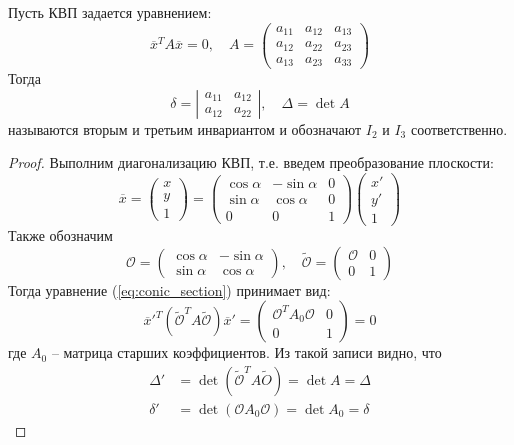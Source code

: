 \begin{Thm}
	Пусть КВП задается уравнением:
	\[\overline{x}^T A \overline{x} = 0, \quad A = \left(\begin{array}{ccc}
	a_{11} & a_{12} & a_{13} \\ 
	a_{12} & a_{22} & a_{23} \\ 
	a_{13} & a_{23} & a_{33}
	\end{array}\right)\]
	Тогда
	\[\delta = \left|\begin{array}{cc}
	a_{11} & a_{12} \\ 
	a_{12} & a_{22}
	\end{array}\right|, \quad \Delta = \det A\]
	называются вторым и третьим инвариантом и обозначают $I_2$ и $I_3$ соответственно. 
\end{Thm}

\begin{proof}
	Выполним диагонализацию КВП, т.е. введем преобразование плоскости:
	\begin{equation} \label{eq:conic_section}
		\overline{x} = \left(\begin{array}{c}
		x \\ 
		y \\ 
		1
		\end{array}\right) = \left(\begin{array}{ccc}
		\cos \alpha & -\sin \alpha & 0 \\ 
		\sin \alpha & \cos \alpha & 0 \\ 
		0 & 0 & 1
		\end{array}\right) \left(\begin{array}{c}
		x' \\ 
		y' \\ 
		1
		\end{array}\right)
	\end{equation}
	Также обозначим 
	\[\mathcal{O} = \left(\begin{array}{cc}
	\cos \alpha & -\sin \alpha \\ 
	\sin \alpha & \cos \alpha
	\end{array}\right), \quad \widetilde{\mathcal{O}} = \left(\begin{array}{c|c}
	\mathcal{O} & 0 \\ 
	\hline
	0 & 1
	\end{array}\right)\]
	Тогда уравнение (\ref{eq:conic_section}) принимает вид:
	\[\overline{x}'^T \left(\widetilde{\mathcal{O}}^T A \widetilde{\mathcal{O}}\right) \overline{x}' = \left(\begin{array}{c|c}
	\mathcal{O}^T A_0 \mathcal{O} & 0 \\
	\hline
	0 & 1
	\end{array}\right) = 0\]
	где $A_0$ -- матрица старших коэффициентов.
	Из такой записи видно, что
	\begin{align*}
		\Delta' &= \det \left(\widetilde{\mathcal{O}}^T A \widetilde{O}\right) = \det A = \Delta \\
		\delta' &= \det \left(\mathcal{O} A_0 \mathcal{O}\right) = \det A_0 = \delta
	\end{align*}
\end{proof}

